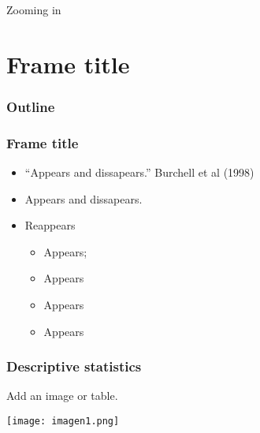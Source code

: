 \documentclass{beamer}
\begin{document}
\begin{frame}{Zooming in}

\end{frame}

\section{Frame title}

 \begin{frame}
       \frametitle{Outline}
       \tableofcontents
\end{frame}
\begin{frame}

\frametitle{Frame title}


\begin{itemize}
\item<1>[1.] ``Appears and dissapears.'' Burchell et al (1998)
\item<1>[2.] Appears and dissapears.
\item<2->[3.] Reappears
\begin{itemize}
\item<2-> Appears;
\item<2-> Appears
\item<2-> Appears
\item<2-> Appears
\end{itemize}
\end{itemize}

\end{frame}





\begin{frame}
\frametitle{Descriptive statistics}

Add an image or table.
\begin{center}
\texttt{[image: imagen1.png]}%
\end{center}
\end{frame}
\end{document}
